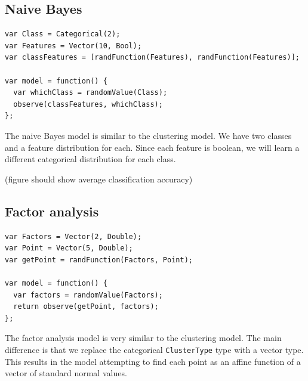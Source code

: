 \documentclass{article}
\begin{document}
% 

\subsection{Naive Bayes}

{\small
\begin{lstlisting}
var Class = Categorical(2);
var Features = Vector(10, Bool);
var classFeatures = [randFunction(Features), randFunction(Features)];

var model = function() {
  var whichClass = randomValue(Class);
  observe(classFeatures, whichClass);
};
\end{lstlisting}
}

The naive Bayes model is similar to the clustering model.  We have two classes and a feature
distribution for each.  Since each feature is boolean, we will learn
a different categorical distribution for each class.

(figure should show average classification accuracy)

  \subsection{Factor analysis}
{\small
\begin{lstlisting}
var Factors = Vector(2, Double);
var Point = Vector(5, Double);
var getPoint = randFunction(Factors, Point);

var model = function() {
  var factors = randomValue(Factors);
  return observe(getPoint, factors);
};
\end{lstlisting}
}

The factor analysis model is very similar to the clustering model.  The main difference is that we replace the categorical \texttt{ClusterType} type with a vector type.  This results in the model attempting to find each point as an affine function of a vector of standard normal values.
\end{document}

